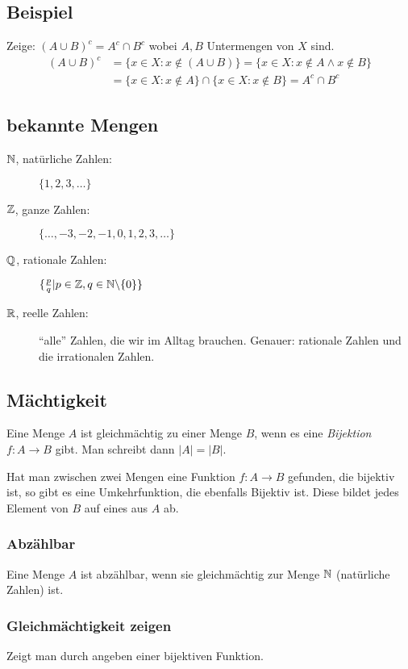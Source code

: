 \subsection*{Beispiel}
Zeige: $(A \cup B)^c = A^c \cap B^c$ wobei $A, B$ Untermengen von $X$ sind.
\begin{align*}
(A \cup B)^c &= \{x \in X: x \not\in (A \cup B)\} = \{x \in X: x \not\in A \land x \not\in B\}\\
&= \{x \in X: x \not\in A\} \cap \{x \in X: x \not\in B\} = A^c \cap B^c
\end{align*}

\subsection{bekannte Mengen}
\begin{description}
	\item[$\mathbb{N}$, natürliche Zahlen:] $\{1, 2, 3, \ldots\}$
	\item[$\mathbb{Z}$, ganze Zahlen:] $\{\ldots, -3, -2, -1, 0, 1, 2, 3, \ldots\}$
	\item[$\mathbb{Q}$, rationale Zahlen:] $\{\frac{p}{q} | p \in \mathbb{Z}, q \in \mathbb{N} \backslash \{0\}\}$
	\item[$\mathbb{R}$, reelle Zahlen:] ``alle'' Zahlen, die wir im Alltag brauchen. Genauer: rationale Zahlen und die irrationalen Zahlen.
\end{description}

\subsection{Mächtigkeit}
Eine Menge $A$ ist gleichmächtig zu einer Menge $B$, wenn es eine \textit{Bijektion}
$f: A \rightarrow B$ gibt. Man schreibt dann $|A| = |B|$.

Hat man zwischen zwei Mengen eine Funktion $f: A \rightarrow B$ gefunden, die bijektiv ist,
so gibt es eine Umkehrfunktion, die ebenfalls Bijektiv ist. Diese bildet jedes Element von $B$
auf eines aus $A$ ab.

\subsubsection{Abzählbar}
Eine Menge $A$ ist abzählbar, wenn sie gleichmächtig zur Menge $\mathbb{N}$ (natürliche Zahlen) ist.

\subsubsection{Gleichmächtigkeit zeigen}
Zeigt man durch angeben einer bijektiven Funktion.

